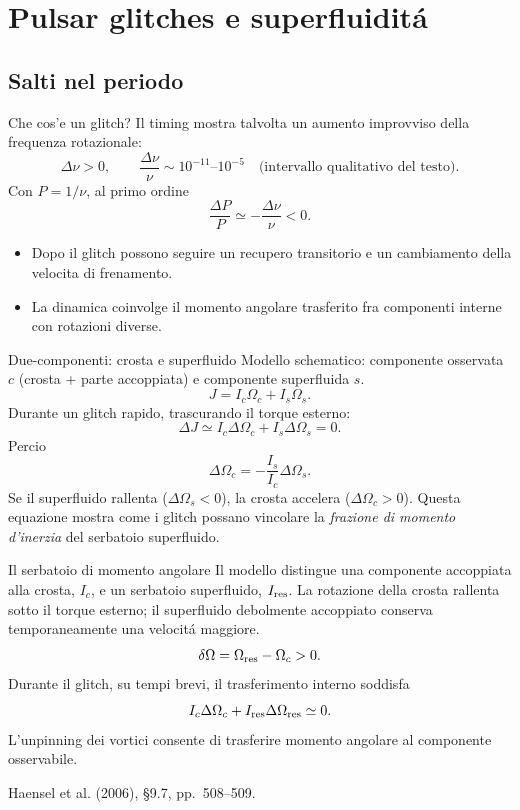 \section{Pulsar glitches e superfluidit\'a}

\subsection{Salti nel periodo}

\begin{frame}[t]{Che cos'e un glitch?}
\small
Il timing mostra talvolta un aumento improvviso della frequenza rotazionale:
\[
\Delta\nu>0,\qquad
\frac{\Delta\nu}{\nu}\sim10^{-11}\text{--}10^{-5}
\quad\text{(intervallo qualitativo del testo).}
\]
Con $P=1/\nu$, al primo ordine
\[
\frac{\Delta P}{P}\simeq-\frac{\Delta\nu}{\nu}<0.
\]
\begin{itemize}
\item Dopo il glitch possono seguire un recupero transitorio e un cambiamento della velocita di frenamento.
\item La dinamica coinvolge il momento angolare trasferito fra componenti interne con rotazioni diverse.
\end{itemize}
\end{frame}

\begin{frame}[t]{Due-componenti: crosta e superfluido}
\small
Modello schematico: componente osservata $c$ (crosta + parte accoppiata) e componente superfluida $s$.
\[
J=I_c\Omega_c+I_s\Omega_s.
\]
Durante un glitch rapido, trascurando il torque esterno:
\[
\Delta J\simeq I_c\Delta\Omega_c+I_s\Delta\Omega_s=0.
\]
Percio
\[
\Delta\Omega_c=-\frac{I_s}{I_c}\Delta\Omega_s.
\]
Se il superfluido rallenta ($\Delta\Omega_s<0$), la crosta accelera ($\Delta\Omega_c>0$).
\medskip
Questa equazione mostra come i glitch possano vincolare la \emph{frazione di momento d'inerzia} del serbatoio superfluido.
\end{frame}

\begin{frame}[t]{Il serbatoio di momento angolare}
\small
Il modello distingue una componente accoppiata alla crosta, $I_c$, e un serbatoio superfluido, $I_{\rm res}$.
La rotazione della crosta rallenta sotto il torque esterno; il superfluido debolmente accoppiato conserva temporaneamente una velocit\'a maggiore.
\[
\delta\Omega=\Omega_{\rm res}-\Omega_c>0.
\]
Durante il glitch, su tempi brevi, il trasferimento interno soddisfa
\[
I_c\Delta\Omega_c+I_{\rm res}\Delta\Omega_{\rm res}\simeq0.
\]
L'unpinning dei vortici consente di trasferire momento angolare al componente osservabile.
\par\medskip
\footnotesize Haensel et al. (2006), \S9.7, pp.~508--509.
\end{frame}

